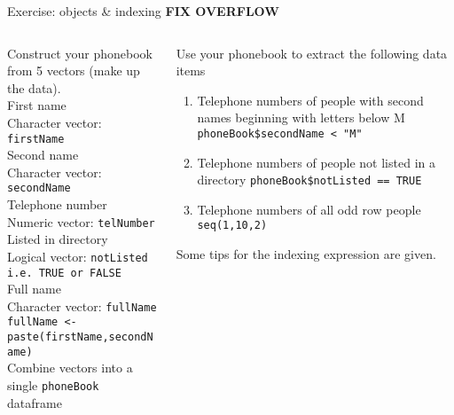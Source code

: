 \documentclass{beamer}
\begin{document}
\begin{frame}{Exercise: objects \& indexing}
    \textbf{FIX OVERFLOW}
    \begin{columns}[t]
        \begin{column}{5cm}
            Construct your phonebook from 5 vectors (make up the data). \\
            First name \\
            Character vector: {\tt firstName} \\
            Second name \\
            Character vector: {\tt secondName} \\
            Telephone number \\
            Numeric vector: {\tt telNumber} \\
            Listed in directory \\
            Logical vector: {\tt notListed} \\
            {\tt    i.e. TRUE or FALSE} \\
            Full name \\
            Character vector: {\tt fullName} \\
            {\tt fullName <- paste(firstName,secondName)} \\
            Combine vectors into a single {\tt phoneBook} dataframe
        \end{column}
        \begin{column}{5cm}
            Use your phonebook to extract the following data items
            \begin{enumerate}
                \item Telephone numbers of people with second names beginning with letters below M
                {\tt  phoneBook\$secondName < "M"}
                \item Telephone numbers of people not listed in a directory
                {\tt  phoneBook\$notListed == TRUE}
                \item Telephone numbers of all odd row people
                {\tt  seq(1,10,2)}
            \end{enumerate}
            Some tips for the indexing expression are given.
        \end{column}
    \end{columns}
\end{frame}
\end{document}
